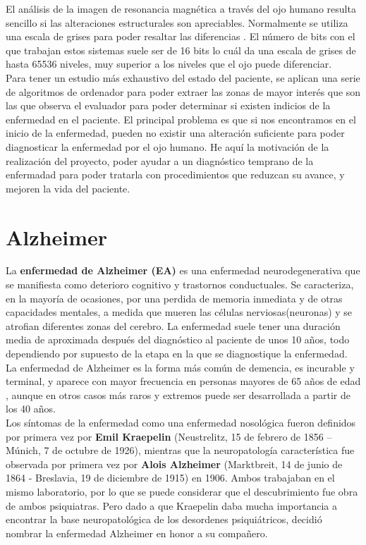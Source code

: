 El análisis de la imagen de resonancia magnética a través del ojo humano resulta sencillo si las alteraciones estructurales son apreciables. Normalmente se utiliza una escala de grises para poder resaltar las diferencias \cite{FormatosImagenes}. El número de bits con el que trabajan estos sistemas suele ser de 16 bits \cite{FormatosImagenes} lo cuál da una escala de grises de hasta 65536 niveles, muy superior a los niveles que el ojo puede diferenciar.\\

Para tener un estudio más exhaustivo del estado del paciente, se aplican una serie de algoritmos de ordenador para poder extraer las zonas de mayor interés que son las que observa el evaluador para poder determinar si existen indicios de la enfermedad en el paciente. El principal problema es que si nos encontramos en el inicio de la enfermedad, pueden no existir una alteración suficiente para poder diagnosticar la enfermedad por el ojo humano. He aquí la motivación de la realización del proyecto, poder ayudar a un diagnóstico temprano de la enfermadad para poder tratarla con procedimientos que reduzcan su avance, y mejoren la vida del paciente.

\section{Alzheimer}

La \textbf{enfermedad de Alzheimer (EA)}  es una enfermedad neurodegenerativa que se manifiesta como deterioro cognitivo y trastornos conductuales. Se caracteriza, en la mayoría de ocasiones,  por una perdida de memoria inmediata  y de otras capacidades mentales, a medida que mueren las células nerviosas(neuronas) y se atrofian diferentes zonas del cerebro. La enfermedad suele tener una duración media de aproximada después del diagnóstico al paciente de unos 10 años, todo dependiendo por supuesto de la etapa en la que se diagnostique la enfermedad.\\

La enfermedad de Alzheimer es la forma más común de demencia, es incurable y terminal, y aparece con mayor frecuencia en personas mayores de 65 años de edad \cite{3}, aunque en otros casos más raros y extremos puede ser desarrollada a partir de los 40 años. \\

Los síntomas de la enfermedad como una enfermedad nosológica fueron definidos por primera vez por \textbf{Emil Kraepelin} (Neustrelitz, 15 de febrero de 1856 – Múnich, 7 de octubre de 1926), mientras que la neuropatología característica fue observada por primera vez por \textbf{Alois Alzheimer} (Marktbreit, 14 de junio de 1864 - Breslavia, 19 de diciembre de 1915) en 1906. Ambos trabajaban en el mismo laboratorio, por lo que se puede considerar que el descubrimiento fue obra de ambos psiquiatras. Pero dado a que Kraepelin daba mucha importancia a encontrar la base neuropatológica de los desordenes psiquiátricos, decidió nombrar la enfermedad Alzheimer en honor a su compañero.\\


